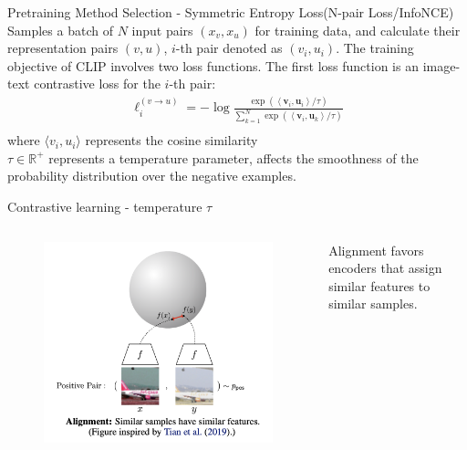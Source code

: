 \documentclass[aspectratio=169,xcolor=dvipsnames]{beamer}
\begin{document}

\begin{frame}{Pretraining Method Selection - Symmetric Entropy Loss(N-pair Loss/InfoNCE)}
Samples a batch of $N$ input pairs $(x_v,x_u)$ for training data, and calculate their representation pairs $(v,u)$, $i$-th pair denoted as $(v_i,u_i)$. The training objective of CLIP involves two loss functions. The first loss function is an image-text contrastive loss for the $i$-th pair: \\
    \begin{align*}
        \ell_i^{(v \rightarrow u)}=-\log \frac{\exp \left(\left\langle\mathbf{v}_i, \mathbf{u}_i\right\rangle / \tau\right)}{\sum_{k=1}^N \exp \left(\left\langle\mathbf{v}_i, \mathbf{u}_k\right\rangle / \tau\right)}\\
    \end{align*}
where $\langle v_i, u_i \rangle$ represents the cosine similarity \\
$\tau \in \mathbb{R^+}$ represents a temperature parameter, affects the smoothness of the probability distribution over the negative examples.\\

\end{frame}


\begin{frame}{Contrastive learning - temperature $\tau$}
    \begin{columns}
        \begin{column}{0.6\textwidth}
            \begin{figure}
                \centering
                \includegraphics[width=0.85\linewidth]{figures/alignment.png}
                \label{alignment} 
            \end{figure}
        \end{column}
        \begin{column}{0.3\textwidth}
            Alignment favors encoders that assign similar features to similar samples.\\
        \end{column}
    \end{columns}
\end{frame}
\end{document}
